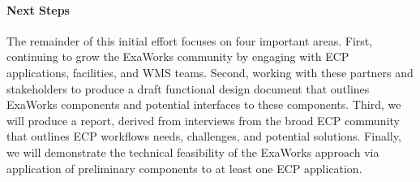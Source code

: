 \paragraph{Next Steps}
The remainder of this initial effort focuses on four important areas. 
First, continuing to grow the ExaWorks community by engaging with ECP 
applications, facilities, and WMS teams. 
Second, working with these partners and stakeholders to produce a draft
functional design document that outlines ExaWorks components
and potential interfaces to these components. 
Third, we will produce a report, derived from interviews from 
the broad ECP community that outlines ECP workflows needs, challenges, 
and potential solutions. 
Finally, we will demonstrate the technical feasibility of the 
ExaWorks approach via application of preliminary components to
at least one ECP application. 
